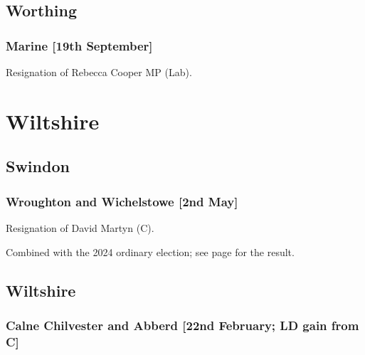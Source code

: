 \documentclass[a4paper,openany]{book}
\begin{document}
\begin{resultsiii}
\subsection*{Worthing}

\subsubsection*{Marine \hspace*{\fill}\nolinebreak[1]%
	\enspace\hspace*{\fill}
	[19th September]}


Resignation of Rebecca Cooper MP (Lab).

\section{Wiltshire}

\subsection*{Swindon}

\subsubsection*{Wroughton and Wichelstowe \hspace*{\fill}\nolinebreak[1]%
	\enspace\hspace*{\fill}
	[2nd May]}


Resignation of David Martyn (C).

Combined with the 2024 ordinary election; see page \pageref{WroughtonWichelstoweSwindon} for the result.

\subsection*{Wiltshire}

\subsubsection*{Calne Chilvester and Abberd \hspace*{\fill}\nolinebreak[1]%
	\enspace\hspace*{\fill}
	[22nd February; LD gain from C]}


\end{resultsiii}
\end{document}
